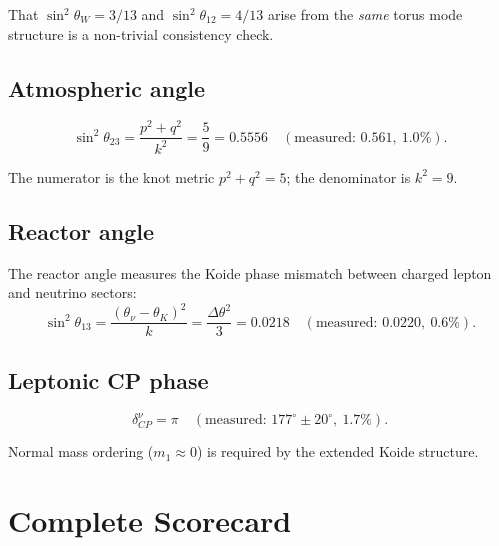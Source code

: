 \documentclass[11pt,a4paper]{article}
\begin{document}
That $\sin^2\theta_W = 3/13$ and $\sin^2\theta_{12} = 4/13$ arise from the \emph{same} torus mode structure is a non-trivial consistency check.

\subsection{Atmospheric angle}

\begin{equation}
  \sin^2\theta_{23} = \frac{p^2+q^2}{k^2} = \frac{5}{9} = 0.5556 \quad (\text{measured: } 0.561,\ 1.0\%).
  \label{eq:atmospheric}
\end{equation}

The numerator is the knot metric $p^2+q^2 = 5$; the denominator is $k^2 = 9$.

\subsection{Reactor angle}

The reactor angle measures the Koide phase mismatch between charged lepton and neutrino sectors:
\begin{equation}
  \sin^2\theta_{13} = \frac{(\theta_\nu - \theta_K)^2}{k} = \frac{\Delta\theta^2}{3} = 0.0218 \quad (\text{measured: } 0.0220,\ 0.6\%).
  \label{eq:reactor}
\end{equation}

\subsection{Leptonic CP phase}

\begin{equation}
  \delta_{CP}^\nu = \pi \quad (\text{measured: } 177^\circ \pm 20^\circ,\ 1.7\%).
  \label{eq:leptonic-cp}
\end{equation}

Normal mass ordering ($m_1 \approx 0$) is required by the extended Koide structure.

\section{Complete Scorecard}
\label{sec:scorecard}
\end{document}
